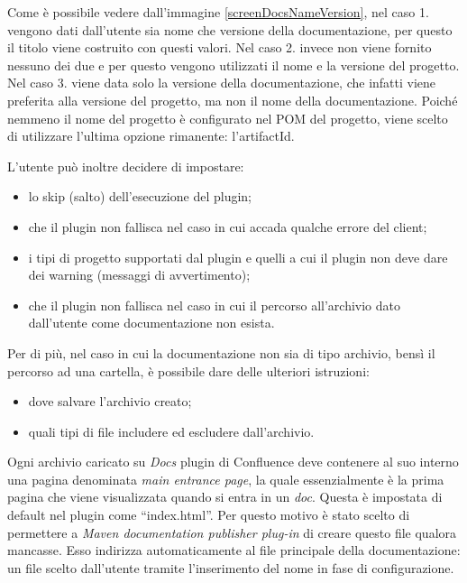 	Come è possibile vedere dall'immagine \ref{screenDocsNameVersion}, nel caso 1. vengono dati dall'utente sia nome che versione della documentazione, per questo il titolo viene costruito con questi valori. 
	Nel caso 2. invece non viene fornito nessuno dei due e per questo vengono utilizzati il nome e la versione del progetto. 
	Nel caso 3. viene data solo la versione della documentazione, che infatti viene preferita alla versione del progetto, ma non il nome della documentazione. 
	Poiché nemmeno il nome del progetto è configurato nel POM del progetto, viene scelto di utilizzare l'ultima opzione rimanente: l'artifactId.



	L'utente può inoltre decidere di impostare:
	\begin{itemize}
		\item lo skip (salto) dell'esecuzione del plugin;
		\item che il plugin non fallisca nel caso in cui accada qualche errore del client;
		\item i tipi di progetto supportati dal plugin e quelli a cui il plugin non deve dare dei warning (messaggi di avvertimento);
		\item che il plugin non fallisca nel caso in cui il percorso all'archivio dato dall'utente come documentazione non esista.
	\end{itemize}

	Per di più, nel caso in cui la documentazione non sia di tipo archivio, bensì il percorso ad una cartella, è possibile dare delle ulteriori istruzioni:
	\begin{itemize}
		\item dove salvare l'archivio creato;
		\item quali tipi di file includere ed escludere dall'archivio.
	\end{itemize}

	Ogni archivio caricato su \emph{Docs} plugin di Confluence deve contenere al suo interno una pagina denominata \emph{main entrance page}, la quale essenzialmente è la prima pagina che viene visualizzata quando si entra in un \emph{doc}.
	Questa è impostata di default nel plugin come ``index.html''.
	Per questo motivo è stato scelto di permettere a \emph{Maven documentation publisher plug-in} di creare questo file qualora mancasse.
	Esso indirizza automaticamente al file principale della documentazione: un file scelto dall'utente tramite l'inserimento del nome in fase di configurazione.

